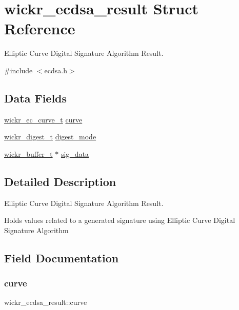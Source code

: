 \hypertarget{structwickr__ecdsa__result}{}\section{wickr\+\_\+ecdsa\+\_\+result Struct Reference}
\label{structwickr__ecdsa__result}


Elliptic Curve Digital Signature Algorithm Result.  




{\ttfamily \#include $<$ecdsa.\+h$>$}

\subsection*{Data Fields}
\begin{DoxyCompactItemize}
\item 
\hyperlink{structwickr__ec__curve}{wickr\+\_\+ec\+\_\+curve\+\_\+t} \hyperlink{structwickr__ecdsa__result_a76bcae0ea46e0f99bfd8fb70aac165bb}{curve}
\item 
\hyperlink{structwickr__digest}{wickr\+\_\+digest\+\_\+t} \hyperlink{structwickr__ecdsa__result_a33c820900693a016ac43702e76b54cff}{digest\+\_\+mode}
\item 
\hyperlink{structwickr__buffer}{wickr\+\_\+buffer\+\_\+t} $\ast$ \hyperlink{structwickr__ecdsa__result_ada32a17d9f713f84142fc6a338ebcc48}{sig\+\_\+data}
\end{DoxyCompactItemize}


\subsection{Detailed Description}
Elliptic Curve Digital Signature Algorithm Result. 

Holds values related to a generated signature using Elliptic Curve Digital Signature Algorithm 

\subsection{Field Documentation}
\mbox{\label{structwickr__ecdsa__result_a76bcae0ea46e0f99bfd8fb70aac165bb}} 
\subsubsection{\texorpdfstring{curve}{curve}}
{\footnotesize\ttfamily wickr\+\_\+ecdsa\+\_\+result\+::curve}

